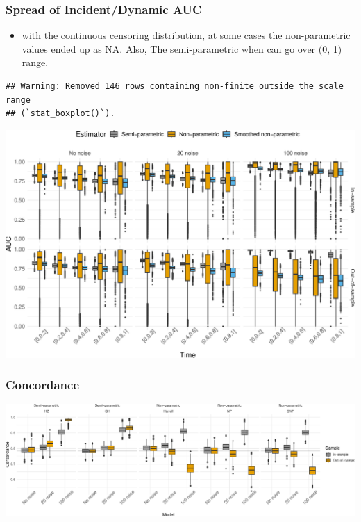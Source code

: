 \documentclass[
]{article}
\providecommand{\tightlist}{%
  \setlength{\itemsep}{0pt}\setlength{\parskip}{0pt}}
\begin{document}
\subsubsection{Spread of Incident/Dynamic
AUC}\label{spread-of-incidentdynamic-auc}

\begin{itemize}
\tightlist
\item
  with the continuous censoring distribution, at some cases the
  non-parametric values ended up as NA. Also, The semi-parametric when
  can go over (0, 1) range.
\end{itemize}

\begin{verbatim}
## Warning: Removed 146 rows containing non-finite outside the scale range
## (`stat_boxplot()`).
\end{verbatim}

\includegraphics{ProgressReport_files/figure-latex/fig_tvauc_box_ovefit-1.pdf}

\subsubsection{Concordance}\label{concordance}

\includegraphics{ProgressReport_files/figure-latex/fig_c_noise-1.pdf}
\end{document}
